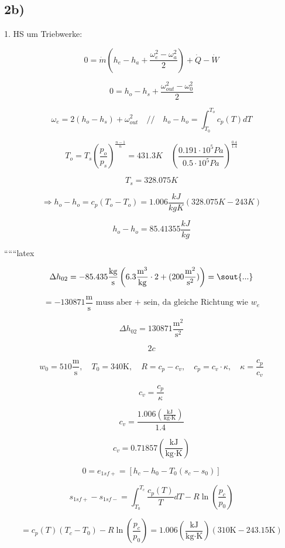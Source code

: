 

\subsection*{2b)}

1. HS um Triebwerke:

\[
0 = \dot{m} (h_e - h_a + \frac{\omega_e^2 - \omega_a^2}{2}) + \dot{Q} - \dot{W}
\]

\[
0 = h_o - h_s + \frac{\omega_{out}^2 - \omega_0^2}{2}
\]

\[
\omega_e = 2 (h_o - h_s) + \omega_{out}^2 \quad // \quad h_o - h_o = \int_{T_0}^{T_o} c_p(T) dT
\]

\[
T_o = T_s \left( \frac{p_o}{p_s} \right)^{\frac{n-1}{n}} = 431.3 K \quad \left( \frac{0.191 \cdot 10^5 Pa}{0.5 \cdot 10^5 Pa} \right)^{\frac{0.4}{1.4}}
\]

\[
T_s = 328.075 K
\]

\[
\Rightarrow h_o - h_o = c_p (T_o - T_o) = 1.006 \frac{kJ}{kgK} (328.075 K - 243 K)
\]

\[
h_o - h_o = 85.41355 \frac{kJ}{kg}
\]

``````latex

\[
\Delta h_{02} = -85.435 \frac{\text{kg}}{\text{s}} \left( 6.3 \frac{\text{m}^3}{\text{kg}} \cdot 2 + (200 \frac{\text{m}^2}{\text{s}^2}) \right) = \text{\sout{...}}
\]

\[
= -130871 \frac{\text{m}}{\text{s}} \text{ muss aber + sein, da gleiche Richtung wie } w_e
\]

\[
\Delta h_{02} = 130871 \frac{\text{m}^2}{\text{s}^2}
\]

\[
2c
\]

\[
w_0 = 510 \frac{\text{m}}{\text{s}}, \quad T_0 = 340 \text{K}, \quad R = c_p - c_v, \quad c_p = c_v \cdot \kappa, \quad \kappa = \frac{c_p}{c_v}
\]

\[
c_v = \frac{c_p}{\kappa}
\]

\[
c_v = \frac{1.006 \left( \frac{\text{kJ}}{\text{kg} \cdot \text{K}} \right)}{1.4}
\]

\[
c_v = 0.71857 \left( \frac{\text{kJ}}{\text{kg} \cdot \text{K}} \right)
\]

\[
0 = e_{1sf+} = \left[ h_c - h_0 - T_0 (s_c - s_0) \right]
\]

\[
s_{1sf+} - s_{1sf-} = \int_{T_0}^{T_c} \frac{c_p(T)}{T} dT - R \ln \left( \frac{p_c}{p_0} \right)
\]

\[
= c_p(T) \left( T_c - T_0 \right) - R \ln \left( \frac{p_c}{p_0} \right) = 1.006 \left( \frac{\text{kJ}}{\text{kg} \cdot \text{K}} \right) (310 \text{K} - 243.15 \text{K})
\]

